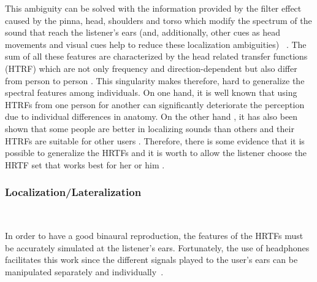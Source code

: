 \documentclass[journal]{IEEEtran}
\begin{document}
This ambiguity can be solved with the information provided by the filter effect caused by the pinna, head, shoulders and torso which modify the spectrum of the sound that reach the listener's ears (and, additionally, other cues as head movements and visual cues help to reduce these localization ambiguities) ~\cite{SpatialAudio2007}. The sum of all these features are characterized by the head related transfer functions (HTRF) which are not only frequency and direction-dependent but also differ from person to person \cite{Rumsey2001}. This singularity makes therefore, hard to generalize the spectral features among individuals. On one hand, it is well known that using HTRFs from one person for another can significantly deteriorate the perception due to individual differences in anatomy. On the other hand , it has also been shown that some people are better in localizing sounds than others and their HTRFs are suitable for other users \cite{SpatialAudio2007}. Therefore, there is some evidence that it is possible to generalize the HRTFs and it is worth to allow the listener choose the HRTF set that works best for her or him \cite{Tame2012}.\\

 

\subsubsection*{Localization/Lateralization}~

In order to have a good binaural reproduction, the features of the HRTFs must be accurately simulated at the listener's ears. Fortunately, the use of headphones facilitates this work since the different signals played to the user's ears can be manipulated separately and individually~\cite{plenge1972}.
\end{document}
